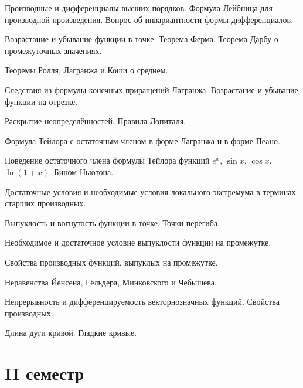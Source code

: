 \documentclass[a4paper]{article}
\begin{document}
\begin{nums}{-3}
\item Производные и дифференциалы высших порядков. Формула Лейбница для производной произведения.
Вопрос об инвариантности формы дифференциалов.
\item Возрастание и убывание функции в точке. Теорема Ферма. Теорема Дарбу о промежуточных
значениях.
\item Теоремы Ролля, Лагранжа и Коши о среднем.
\item Следствия из формулы конечных приращений Лагранжа. Возрастание и убывание функции на отрезке.
\item Раскрытие неопределённостей. Правила Лопиталя.
\item Формула Тейлора с остаточным членом в форме Лагранжа и в форме Пеано.
\item Поведение остаточного члена формулы Тейлора функций $e^x$, $\sin x$, $\cos x$, $\ln(1+x)$. Бином Ньютона.
\item Достаточные условия и необходимые условия локального экстремума в терминах старших производных.
\item Выпуклость и вогнутость функции в точке. Точки перегиба.
\item Необходимое и достаточное условие выпуклости функции на промежутке.
\item Свойства производных функций, выпуклых на промежутке.
\item Неравенства Йенсена, Гёльдера, Минковского и Чебышева.
\item Непрерывность и дифференцируемость векторнозначных функций. Свойства производных.
\item Длина дуги кривой. Гладкие кривые.
\end{nums}

\pagebreak

\section*{II семестр}
\end{document}
